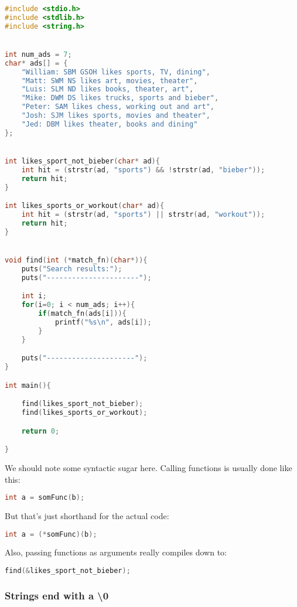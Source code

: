 \begin{lstlisting}[language=c]
#include <stdio.h>
#include <stdlib.h>
#include <string.h>


int num_ads = 7;
char* ads[] = {
	"William: SBM GSOH likes sports, TV, dining",
	"Matt: SWM NS likes art, movies, theater",
	"Luis: SLM ND likes books, theater, art",
	"Mike: DWM DS likes trucks, sports and bieber",
	"Peter: SAM likes chess, working out and art",
	"Josh: SJM likes sports, movies and theater",
	"Jed: DBM likes theater, books and dining"
};


int likes_sport_not_bieber(char* ad){
	int hit = (strstr(ad, "sports") && !strstr(ad, "bieber"));
	return hit;
}

int likes_sports_or_workout(char* ad){
	int hit = (strstr(ad, "sports") || strstr(ad, "workout"));
	return hit;
}


void find(int (*match_fn)(char*)){
	puts("Search results:");
	puts("----------------------");

	int i;
	for(i=0; i < num_ads; i++){
		if(match_fn(ads[i])){
			printf("%s\n", ads[i]);
		}
	}

	puts("---------------------");
}

int main(){

	find(likes_sport_not_bieber);
	find(likes_sports_or_workout);

	return 0;

}

\end{lstlisting}


We should note some syntactic sugar here. 
Calling functions is usually done like this:
\begin{lstlisting}[language=c]
int a = somFunc(b);
\end{lstlisting}
But that's just shorthand for the actual code:
\begin{lstlisting}[language=c]
int a = (*somFunc)(b);
\end{lstlisting}

Also, passing functions as arguments really compiles down to:
\begin{lstlisting}[language=c]
find(&likes_sport_not_bieber);
\end{lstlisting}



\subsubsection{Strings end with a \textbackslash 0}

